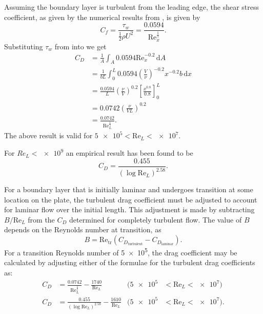 Assuming the boundary layer is turbulent from the leading edge, the shear stress coefficient, as given by the numerical results from , is given by
\begin{equation} \label{eq:shearstressflatplateturb}
  C_f = \frac{\tau_w}{\frac{1}{2}\rho U^2} = \frac{\num{0,0594} }{\mathrm{Re}_x^{\frac{1}{5}}}
.\end{equation}
Substituting $\tau_w$ from  into  we get
\begin{align*}
  C_D &= \frac{1}{A} \int_A \num{0,0594} \mathrm{Re}_x^{-\num{0,2} } \, \mathrm{d}A \\
  &= \frac{1}{bL} \int_{0}^{L} \num{0,0594} \left( \frac{V}{\nu} \right)^{-\num{0,2} }x^{-\num{0,2} }b \, \mathrm{d}x  \\
  &= \frac{\num{0,0594} }{L} \left( \frac{\nu}{V} \right)^{\num{0,2} } \left[ \frac{x^{\num{0,8} }}{\num{0,8} } \right]_{0}^{L} \\
  &= \num{0,0742}  \left( \frac{\nu}{VL} \right)^{\num{0,2} } \\
  &= \frac{\num{0,0742}}{\mathrm{Re}_L^{\frac{1}{5}}}
.\end{align*}
The above result is valid for $\num{5e5} < \mathrm{Re}_L < \num{e7}$.

For $Re_L < \num{e9}$ an empirical result has been found to be
\begin{equation*}
  C_D = \frac{\num{0,455} }{\left( \log \mathrm{Re}_L \right)^{\num{2,58}}}
.\end{equation*}

For a boundary layer that is initially laminar and undergoes transition at some location on the plate, the turbulent drag coefficient must be adjusted to account for laminar flow over the initial length.
This adjustment is made by subtracting $B / \mathrm{Re}_L$ from the $C_D$ determined for completely turbulent flow.
The value of $B$ depends on the Reynolds number at transition, as
\begin{equation*}
  B = \mathrm{Re}_{\mathrm{tr}} \left( C_{D_{\text{turbulent}}} - C_{D_{\text{laminar}}} \right)
.\end{equation*}
For a transition Reynolds number of \num{5e5}, the drag coefficient may be calculated by adjusting either of the formulae for the turbulent drag coefficients as:
\begin{align*}
  C_D &= \frac{\num{0,0742}}{\mathrm{Re}_L^{\frac{1}{5}}} - \frac{\num{1740} }{\mathrm{Re}_L} & \bigg( \num{5e5} &< \mathrm{Re}_L < \num{e7}  \bigg) \\
  C_D &= \frac{\num{0,455} }{\left( \log \mathrm{Re}_L \right)^{\num{2,58} }} - \frac{\num{1610} }{\mathrm{Re}_L} & \bigg( \num{5e5}  &< \mathrm{Re}_L < \num{e7} \bigg)
.\end{align*}

